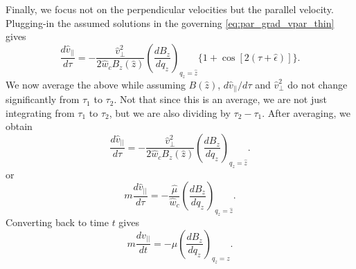 \documentclass[oneside,a4paper,11pt]{report}
\begin{document}
Finally, we focus not on the perpendicular velocities but the parallel velocity. Plugging-in the assumed solutions in the governing \cref{eq:par_grad_vpar_thin} gives
\begin{equation}
    \frac{d\hat{v}_{||}}{d\tau} = -\frac{\hat{v}^2_{\perp}}{2\hat{w}_c B_z(\hat{z})} \left ( \frac{dB_z}{dq_z} \right)_{q_z = \hat{z}} \{ 1 + \cos [2(\tau + \hat{\epsilon})] \}.
\end{equation}
We now average the above while assuming $B(\hat{z})$, $d\hat{v}_{||}/d\tau$ and $\hat{v}^2_\perp$ do not change significantly from $\tau_1$ to $\tau_2$. Not that since this is an average, we are not just integrating from $\tau_1$ to $\tau_2$, but we are also dividing by $\tau_2 - \tau_1$. After  averaging, we obtain
\begin{equation}
    \frac{d\hat{v}_{||}}{d\tau} = -\frac{\hat{v}^2_{\perp}}{2\hat{w}_c B_z(\hat{z})} \left ( \frac{dB_z}{dq_z} \right)_{q_z = \hat{z}} .
\end{equation}
or
\begin{equation}
    m \frac{d\hat{v}_{||}}{d\tau} = -\frac{\hat{\mu}}{\hat{w}_c} \left ( \frac{dB_z}{dq_z} \right)_{q_z = \hat{z}} .
\end{equation}
Converting back to time $t$ gives
\begin{equation}
    m \frac{dv_{||}}{dt} = -\mu \left ( \frac{dB_z}{dq_z} \right)_{q_z = z} .
\end{equation}


\end{document}
